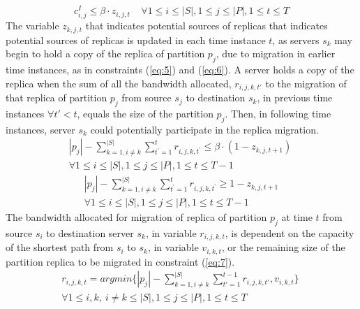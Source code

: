 \begin{equation}
c_{i,j}^I\leq\beta{}\cdot{}z_{i,j,t} \ \ \ \ \ \forall{}1\leq{}i\leq{}\left\vert{}S\right\vert{},1\leq{}j\leq{}\left\vert{}P\right\vert{},1\leq{}t\leq{}T
\label{eq:4}
\end{equation}
The variable $z_{k,j,t}$ that indicates potential sources of replicas that indicates potential sources of replicas is updated in each time instance $t$, as servers $s_{k}$ may begin to hold a copy of the replica of partition $p_{j}$, due to migration in earlier time instances, as in constraints (\ref{eq:5}) and (\ref{eq:6}). A server holds a copy of the replica when the sum of all the bandwidth allocated, $r_{i,j,k,t'}$ to the migration of that replica of partition $p_{j}$ from source $s_{j}$ to destination $s_{k}$, in previous time instances $\forall t' < t$, equals the size of the partition $p_{j}$. Then, in following time instances, server $s_{k}$ could potentially participate in the replica migration.
\vspace{-5mm}
\begin{multline}
\left\vert{}p_j\right\vert{}-\sum_{k=1,i\not=k}^{\left\vert{}S\right\vert{}}\sum_{t^{'}=1}^tr_{i,j,k,t^{'}}\leq{}\beta{}\cdot{}\left(1-z_{k,j,t+1}\right)\ \\
\forall{}1\leq{}i\leq{}\left\vert{}S\right\vert{},1\leq{}j\leq{}\left\vert{}P\right\vert{},1\leq{}t\leq{}T-1
\label{eq:5}
\end{multline}
\vspace{-10mm}
\begin{multline}
\left\vert{}p_j\right\vert{}-\sum_{k=1,i\not=k}^{\left\vert{}S\right\vert{}}\sum_{t^{'}=1}^tr_{i,j,k,t^{'}}\geq{}1-z_{k,j,t+1} \\
\forall{}1\leq{}i\leq{}\left\vert{}S\right\vert{},1\leq{}j\leq{}\left\vert{}P\right\vert{},1\leq{}t\leq{}T-1
\label{eq:6}
\end{multline}
The bandwidth allocated for migration of replica of partition $p_{j}$ at time $t$ from source $s_{i}$ to destination server $s_{k}$, in variable $r_{i,j,k,t}$, is dependent on the capacity of the shortest path from $s_{i}$ to $s_{k}$, in variable $v_{i,k,t}$, or the remaining size of the partition replica to be migrated in constraint (\ref{eq:7}).
\vspace{-3mm}
\begin{multline}
r_{i,j,k,t}=argmin\{\left\vert{}p_{j}\right\vert{}-\sum_{k=1,i\not=k}^{\left\vert{}S\right\vert{}}\sum_{t'=1}^{t-1}r_{i,j,k,t'},v_{i,k,t}\}\ \\ \forall{}1\leq{}i,k,\
i\not=k\leq{}\left\vert{}S\right\vert{},1\leq{}j\leq{}\left\vert{}P\right\vert{},1\leq{}t\leq{}T
\label{eq:7}
\end{multline}
